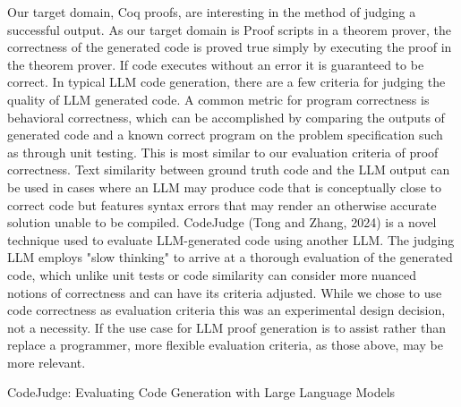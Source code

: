 Our target domain, Coq proofs, are interesting in the method of judging a successful output.
As our target domain is Proof scripts in a theorem prover,
the correctness of the generated code is proved true
simply by executing the proof in the theorem prover.
If code executes without an error it is guaranteed to be correct.
In typical LLM code generation,
there are a few criteria for judging the quality of LLM generated code.  
A common metric for program correctness is behavioral correctness,
which can be accomplished by comparing the outputs of generated code
and a known correct program on the problem specification such as through unit testing.
This is most similar to our evaluation criteria of proof correctness.
Text similarity between ground truth code and the LLM output can be used
in cases where an LLM may produce code that is conceptually close
to correct code but features syntax errors that may render an
otherwise accurate solution unable to be compiled.
CodeJudge (Tong and Zhang, 2024) is a novel technique
used to evaluate LLM-generated code using another LLM.
The judging LLM employs "slow thinking" to arrive at a
thorough evaluation of the generated code,
which unlike unit tests or code similarity can consider
more nuanced notions of correctness and can have its
criteria adjusted.
While we chose to use code correctness as evaluation criteria 
this was an experimental design decision, not a necessity.
If the use case for LLM proof generation is to assist 
rather than replace a programmer, 
more flexible evaluation criteria, as those above, may be more relevant. 

CodeJudge: Evaluating Code Generation 
with Large Language Models